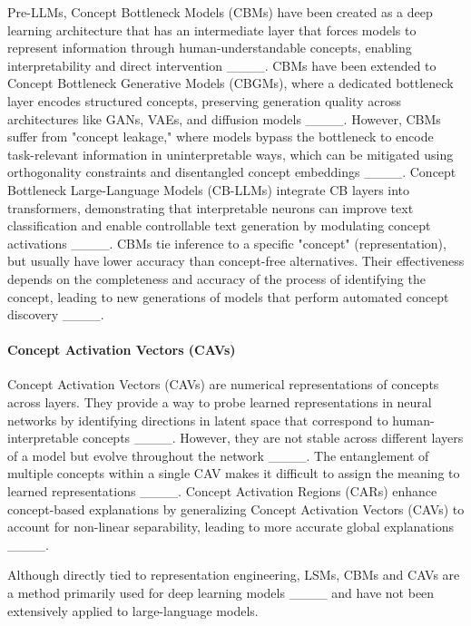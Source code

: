 Pre-LLMs, Concept Bottleneck Models (CBMs) have been created as a deep learning architecture that has an intermediate layer that forces models to represent information through human-understandable concepts, enabling interpretability and direct intervention ____. CBMs have been extended to Concept Bottleneck Generative Models (CBGMs), where a dedicated bottleneck layer encodes structured concepts, preserving generation quality across architectures like GANs, VAEs, and diffusion models ____. However, CBMs suffer from "concept leakage," where models bypass the bottleneck to encode task-relevant information in uninterpretable ways, which can be mitigated using orthogonality constraints and disentangled concept embeddings ____. Concept Bottleneck Large-Language Models (CB-LLMs) integrate CB layers into transformers, demonstrating that interpretable neurons can improve text classification and enable controllable text generation by modulating concept activations ____. CBMs tie inference to a specific "concept" (representation), but usually have lower accuracy than concept-free alternatives. Their effectiveness depends on the completeness and accuracy of the process of identifying the concept, leading to new generations of models that perform automated concept discovery ____. 

\paragraph{Concept Activation Vectors (CAVs)}  

Concept Activation Vectors (CAVs) are numerical representations of concepts across layers. They provide a way to probe learned representations in neural networks by identifying directions in latent space that correspond to human-interpretable concepts ____. However, they are not stable across different layers of a model but evolve throughout the network ____. The entanglement of multiple concepts within a single CAV makes it difficult to assign the meaning to learned representations ____. Concept Activation Regions (CARs) enhance concept-based explanations by generalizing Concept Activation Vectors (CAVs) to account for non-linear separability, leading to more accurate global explanations ____.  

Although directly tied to representation engineering, LSMs, CBMs and CAVs are a method primarily used for deep learning models ____ and have not been extensively applied to large-language models.